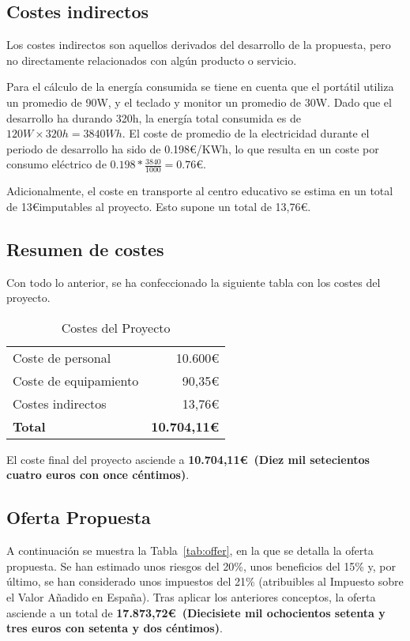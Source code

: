 \subsection{Costes indirectos}\label{subsec:indirect-cost}
Los costes indirectos son aquellos derivados del desarrollo de la propuesta, pero no directamente relacionados con algún producto o servicio.

Para el cálculo de la energía consumida se tiene en cuenta que el portátil utiliza un promedio de 90W, y el teclado y monitor un promedio de 30W. Dado que el desarrollo ha durando 320h, la energía total consumida es de $120W\times 320h = 3840Wh$. El coste de promedio de la electricidad durante el periodo de desarrollo ha sido de 0.198\euro/KWh, lo que resulta en un coste por consumo eléctrico de $0.198*\frac{3840}{1000} = 0.76\euro$.

Adicionalmente, el coste en transporte al centro educativo se estima en un total de 13\euro imputables al proyecto. Esto supone un total de 13,76\euro.

\subsection{Resumen de costes}
Con todo lo anterior, se ha confeccionado la siguiente tabla con los costes del proyecto.

\begin{table}[H]
    \begin{tabular}{@{}lr@{}}
        \toprule
        Coste de personal & 10.600\euro\\
        Coste de equipamiento & 90,35\euro\\
        Costes indirectos & 13,76\euro\\ \midrule
        \textbf{Total} & \textbf{10.704,11\euro}\\
        \bottomrule
    \end{tabular}
    \caption{Costes del Proyecto}\label{tab:resumen-costes}
\end{table}

El coste final del proyecto asciende a \textbf{10.704,11\euro~(Diez mil setecientos cuatro euros con once céntimos)}.

\subsection{Oferta Propuesta}\label{subsec:offer}

A continuación se muestra la Tabla~\ref{tab:offer}, en la que se detalla la oferta propuesta. Se han estimado unos riesgos del 20\%, unos beneficios del 15\% y, por último, se han considerado unos impuestos del 21\% (atribuibles al Impuesto sobre el Valor Añadido en España). Tras aplicar los anteriores conceptos, la oferta asciende a un total de \textbf{17.873,72\euro~(Diecisiete mil ochocientos setenta y tres euros con setenta y dos céntimos)}.

